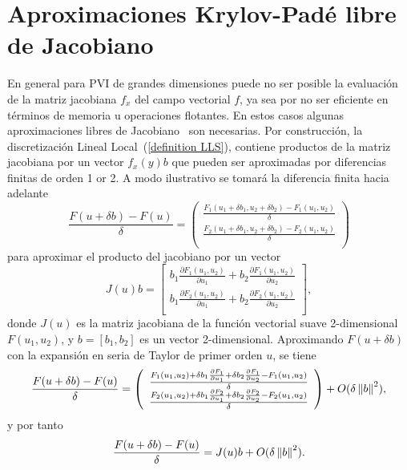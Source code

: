 \section{Aproximaciones Krylov-Padé libre de Jacobiano}
En general para PVI de grandes dimensiones puede no ser posible la evaluación de la matriz jacobiana $f_x$ del campo vectorial $f$, ya sea por no ser eficiente en términos de memoria u operaciones flotantes. En estos casos algunas aproximaciones libres de Jacobiano~\cite{al2009complex,knoll2004jacobian} son necesarias. Por construcción, la discretización Lineal Local~(\ref{definition LLS}), contiene productos de la matriz jacobiana por un vector  $f_x(y)b$ que pueden ser aproximadas por diferencias finitas de orden 1 or 2. A modo ilustrativo se tomará la diferencia finita hacia adelante
\begin{equation*}
	\frac{F(u+\delta b)-F(u)}{\delta} =  \left(\begin{array}{c}
		\frac{F_1(u_1+\delta b_1,u_2+\delta b_2)-F_1(u_1,u_2)}{\delta}\\
		\frac{F_2(u_1+\delta b_1,u_2+\delta b_2)-F_2(u_1,u_2)}{\delta}\\
	\end{array}\right)
\end{equation*}
para aproximar el producto del jacobiano por un vector \begin{equation*}
	J(u)b = \left[\begin{array}{c}
		b_1\frac{\partial F_1(u_1,u_2)}{\partial u_1} + b_2\frac{\partial F_1(u_1,u_2)}{\partial u_2}\\
		b_1\frac{\partial F_2(u_1,u_2)}{\partial u_1} + b_2\frac{\partial F_2(u_1,u_2)}{\partial u_2}\\
	\end{array}\right],
\end{equation*}
donde $J(u)$ es la matriz jacobiana de la función vectorial suave 2-dimensional $F(u_1,u_2)$, y $b=[b_1,b_2]$ es un vector 2-dimensional. Aproximando $F(u+\delta b)$ con la expansión en seria de Taylor de primer orden $u$, se tiene
\begin{equation*}
	\frac{F(u+\delta b)-F(u)}{\delta} =  \left(\begin{array}{c}
		\frac{F_1(u_1,u_2) + \delta b_1 \frac{\partial F_1}{\partial u_1} + \delta b_2 \frac{\partial F_1}{\partial u_2} -F_1(u_1,u_2)}{\delta}\\
		\frac{F_2(u_1,u_2) + \delta b_1 \frac{\partial F_2}{\partial u_1} + \delta b_2 \frac{\partial F_2}{\partial u_2} -F_2(u_1,u_2)}{\delta}\\
	\end{array}\right)  + O(\delta\left\lVert b \right\rVert^2),
\end{equation*}
y por tanto
\begin{equation*}
	\frac{F(u+\delta b)-F(u)}{\delta} =  J(u)b + O(\delta\left\lVert b \right\rVert^2).
\end{equation*}

